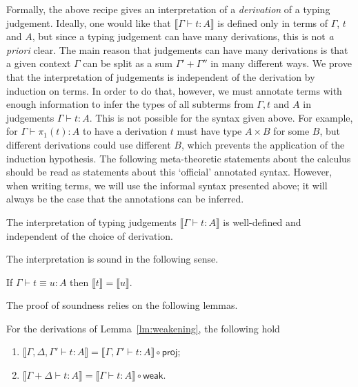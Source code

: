 \documentclass[a4paper,UKenglish,cleveref, autoref, thm-restate]{lipics-v2021}
\newcommand{\proj}{\mathsf{proj}}
\newcommand{\semweak}{\mathsf{weak}}
\newcommand{\ts}{\vdash}
\newcommand{\hastype}[3]{#1\ts #2 : #3}
\newcommand{\jeq}{\equiv}
\newcommand{\den}[1]{\llbracket #1\rrbracket}
\begin{document}
\begin{remark} \label{rem:independence}
Formally, the above recipe gives an interpretation of a \emph{derivation} of a typing judgement. Ideally, one would like that $\den{\hastype\Gamma tA}$ is defined only
in terms of $\Gamma$, $t$ and $A$, but since a typing judgement can have many derivations, this is not \textit{a priori} clear. The main reason that judgements 
can have many derivations is that a given context $\Gamma$ can be split as a sum $\Gamma' + \Gamma''$ in many different ways. We prove that the interpretation 
of judgements is independent of the derivation by induction on terms. In order to do that, however, we must annotate terms with enough information to infer the 
types of all subterms from $\Gamma, t$ and $A$ in judgements $\hastype\Gamma tA$. This is not possible for the syntax given above. For example, for 
$\hastype\Gamma{\pi_1(t)}A$ to have a derivation $t$ must have type $A \times B$ for some $B$, but different derivations could use different $B$, which prevents the application of the induction hypothesis. The following meta-theoretic statements about the calculus should be read as statements about this `official' annotated
syntax. However, when writing terms, we will use the informal syntax presented above; it will always be the case that the annotations can be inferred.
\end{remark}

\begin{theorem} \label{thm:SemIndependence}
 The interpretation of typing judgements $\den{\hastype\Gamma tA}$ is well-defined and independent of the choice of derivation.
\end{theorem}

The interpretation is sound in the following sense.
\begin{theorem}[Soundness] \label{thm:Soundness:Term:Interpr}
 If $\hastype{\Gamma}{t\jeq u}A$ then $\den t = \den u$.
\end{theorem}

The proof of soundness relies on the following lemmas.

\begin{lemma} \label{lem:sem:weak}
For the derivations of Lemma~\ref{lm:weakening}, the following hold 
\begin{enumerate}
    \item $\den{\hastype{\Gamma,\Delta,\Gamma'}tA} = \den{\hastype{\Gamma,\Gamma'}tA} \circ \proj$;
    \item $\den{\hastype{\Gamma+\Delta}tA} = \den{\hastype{\Gamma}tA} \circ \semweak$.
\end{enumerate}
\end{lemma}
\end{document}
